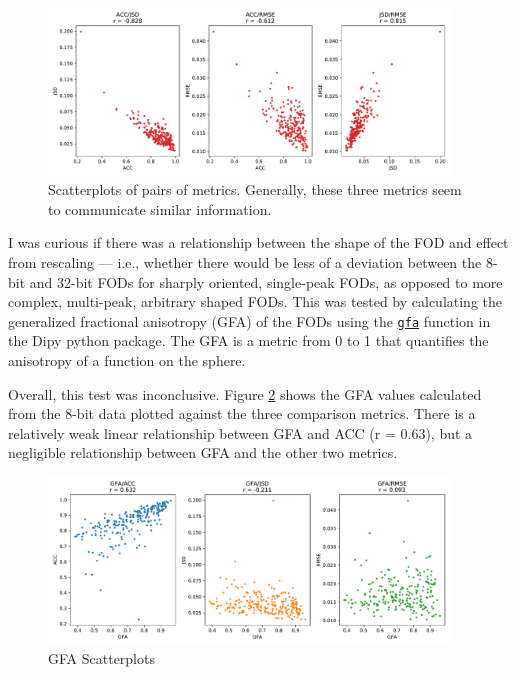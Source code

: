 \documentclass[11pt]{article}
\begin{document}
\begin{figure}[h]
  \centering
  \includegraphics[width=0.95\textwidth]{../plots/scatter}
  \caption{Scatterplots of pairs of metrics. Generally, these three metrics seem
    to communicate similar information.}
  \label{fig:scatter}
\end{figure}

I was curious if there was a relationship between the shape of the FOD and
effect from rescaling --- i.e., whether there would be less of a deviation
between the 8-bit and 32-bit FODs for sharply oriented, single-peak FODs, as
opposed to more complex, multi-peak, arbitrary shaped FODs. This was tested by
calculating the generalized fractional anisotropy (GFA) of the FODs using the
\href{http://nipy.org/dipy/reference/dipy.reconst.html#gfa}{\texttt{gfa}}
function in the Dipy python package. The GFA is a metric from 0 to 1 that
quantifies the anisotropy of a function on the sphere.

Overall, this test was inconclusive. Figure \ref{fig:gfa} shows the GFA values
calculated from the 8-bit data plotted against the three comparison
metrics. There is a relatively weak linear relationship between GFA and ACC (r =
0.63), but a negligible relationship between GFA and the other two metrics.

\begin{figure}[h]
  \centering
  \includegraphics[width=0.95\textwidth]{../plots/gfa}
  \caption{GFA Scatterplots}
  \label{fig:gfa}
\end{figure}
\end{document}
